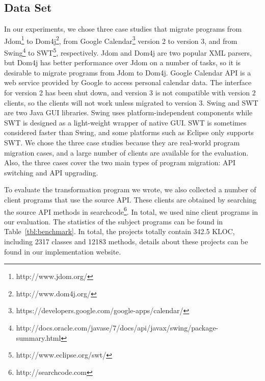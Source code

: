 \documentclass[a4paper, USenglish]{lipics-v2016}
\theoremstyle{plain}
\begin{document}
\subsection{Data Set}
In our experiments, we chose three case studies that migrate programs
from Jdom\footnote{http://www.jdom.org/} to
Dom4j\footnote{ http://www.dom4j.org/}, from Google
Calendar\footnote{https://developers.google.com/google-apps/calendar/}
version 2 to version 3, and from Swing\footnote{http://docs.oracle.com/javase/7/docs/api/javax/swing/package-summary.html} to SWT\footnote{http://www.eclipse.org/swt/}, respectively. Jdom and Dom4j are two popular XML parsers, but Dom4j has better performance over Jdom on a number of tasks, so it is desirable to migrate programs from Jdom to Dom4j. Google Calendar API
is a web service provided by Google to access personal calendar data.
The interface for version 2 has been shut down, and version 3 is not
compatible with version 2 clients, so the clients will not work unless migrated to version 3. Swing and SWT are two Java GUI
libraries. Swing uses platform-independent components while SWT is
designed as a light-weight wrapper of native GUI. SWT is sometimes
considered faster than Swing, and some platforms such as Eclipse only
supports SWT. We chose the three case studies
because they are real-world program migration cases, and a large
number of clients are available for the evaluation. Also, the three
cases cover the two main types of program migration: API
switching and API upgrading.

To evaluate the transformation program we wrote, we also collected a
number of client programs that use the source API. These clients are
obtained by searching the source API methods in
searchcode\footnote{http://searchcode.com}. In total, we used nine client programs in our evaluation. 
The statistics of the subject programs can be found in
Table~\ref{tbl:benchmark}. In total, the projects totally contain 342.5
KLOC, including 2317 classes and 12183 methods, details about these projects can be found in our implementation website.
\end{document}
